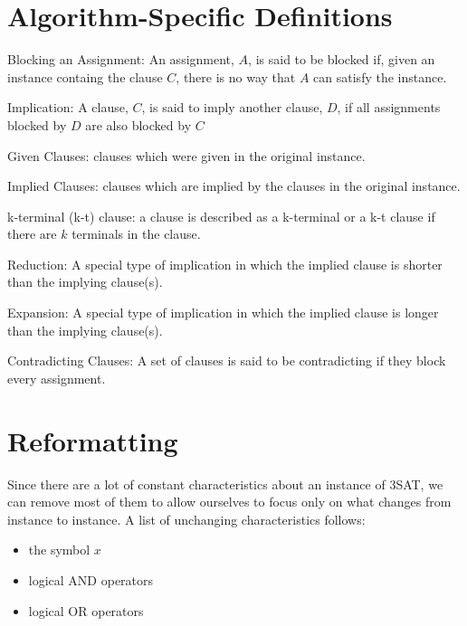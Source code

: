 \documentclass[manuscript]{acmart}
\begin{document}
    \section{Algorithm-Specific Definitions}
    \begin{definition}
        Blocking an Assignment: An assignment, $A$, is said to be blocked if, 
        given an instance containg the clause $C$, there is no way that $A$ can 
        satisfy the instance.
    \end{definition}
    \begin{definition}
        Implication: A clause, $C$, is said to imply another clause, $D$, if all 
        assignments blocked by $D$ are also blocked by $C$ 
    \end{definition}
    \begin{definition}
        Given Clauses: clauses which were given in the original instance.
    \end{definition}
    \begin{definition}
        Implied Clauses: clauses which are implied by the clauses in the original instance.
    \end{definition}
    \begin{definition}
        k-terminal (k-t) clause: a clause is described as a k-terminal or a k-t clause
        if there are $k$ terminals in the clause.
    \end{definition}
    \begin{definition}
        Reduction: A special type of implication in which the implied 
        clause is shorter than the implying clause(s).
    \end{definition}
    \begin{definition}
        Expansion: A special type of implication in which the 
        implied clause is longer than the implying clause(s).
    \end{definition}
    \begin{definition}
        Contradicting Clauses: A set of clauses is said to be contradicting if
        they block every assignment.
    \end{definition}

    \section{Reformatting}

    Since there are a lot of constant characteristics about an instance of 3SAT, 
    we can remove most of them to allow ourselves to focus only on what changes
    from instance to instance. A list of unchanging characteristics follows:
    \begin{itemize}
        \item the symbol $x$
        \item logical AND operators
        \item logical OR operators
    \end{itemize}
    
\end{document}
